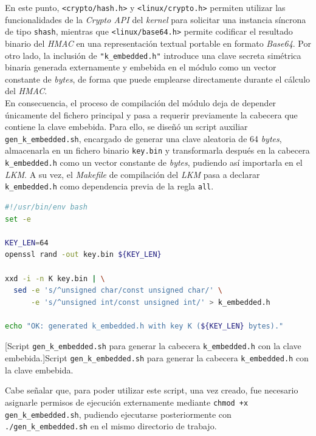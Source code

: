 En este punto, \verb|<crypto/hash.h>| y \verb|<linux/crypto.h>| permiten utilizar las funcionalidades de la \textit{Crypto API} del \textit{kernel} para solicitar una instancia síncrona de tipo \verb|shash|, mientras que \verb|<linux/base64.h>| permite codificar el resultado binario del \textit{HMAC} en una representación textual portable en formato \textit{Base64}.
Por otro lado, la inclusión de \verb|"k_embedded.h"| introduce una clave secreta simétrica binaria generada externamente y embebida en el módulo como un vector constante de \textit{bytes}, de forma que puede emplearse directamente durante el cálculo del \textit{HMAC}.\\

En consecuencia, el proceso de compilación del módulo deja de depender únicamente del fichero principal y pasa a requerir previamente la cabecera que contiene la clave embebida.
Para ello, se diseñó un script auxiliar \verb|gen_k_embedded.sh|, encargado de generar una clave aleatoria de 64 \textit{bytes}, almacenarla en un fichero binario \verb|key.bin| y transformarla después en la cabecera \verb|k_embedded.h| como un vector constante de \textit{bytes}, pudiendo así importarla en el \textit{LKM}.
A su vez, el \textit{Makefile} de compilación del \textit{LKM} pasa a declarar \verb|k_embedded.h| como dependencia previa de la regla \verb|all|.\\

\begin{lstlisting}[language=bash]
#!/usr/bin/env bash
set -e

KEY_LEN=64
openssl rand -out key.bin ${KEY_LEN}

xxd -i -n K key.bin | \
  sed -e 's/^unsigned char/const unsigned char/' \
      -e 's/^unsigned int/const unsigned int/' > k_embedded.h

echo "OK: generated k_embedded.h with key K (${KEY_LEN} bytes)."
\end{lstlisting}
\captionsetup{type=code,justification=centering,singlelinecheck=false}
\captionof{code}[Script \texttt{gen\_k\_embedded.sh} para generar la cabecera \texttt{k\_embedded.h} con la clave embebida.]{Script \texttt{gen\_k\_embedded.sh} para generar la cabecera \texttt{k\_embedded.h} con la clave embebida.}
\label{cod:gen_k_embedded}
\vspace{\baselineskip}

Cabe señalar que, para poder utilizar este script, una vez creado, fue necesario asignarle permisos de ejecución externamente mediante \verb|chmod +x gen_k_embedded.sh|, pudiendo ejecutarse posteriormente con \verb|./gen_k_embedded.sh| en el mismo directorio de trabajo.\\

